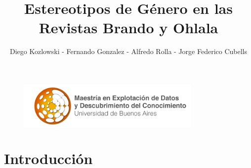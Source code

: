 \documentclass[a4paper]{article}
\title{Estereotipos de Género en las Revistas Brando y Ohlala}
\author{Diego Kozlowski - Fernando Gonzalez - Alfredo Rolla - Jorge Federico Cubells}
\begin{document}
\begin{figure}
\centering
\includegraphics[width=0.8\textwidth]{logos/dmuba.PNG}
\end{figure}

\maketitle

\section{Introducci\'on}
\end{document}
